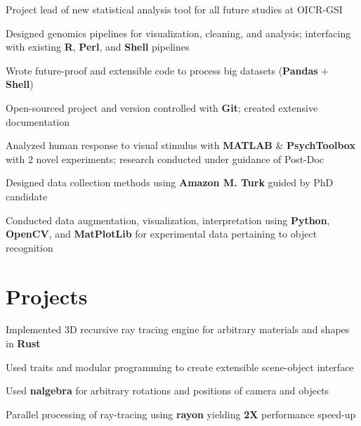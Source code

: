 \documentclass[]{chandan-cv}
\begin{document}
\begin{minipage}[t]{0.75\textwidth}
\begin{tightemize}
	\item Project lead of new statistical analysis tool for all future studies at OICR-GSI
	\item Designed genomics pipelines for visualization, cleaning, and analysis; 
	interfacing with existing \textbf{R}, \textbf{Perl}, and \textbf{Shell} pipelines
	\item Wrote future-proof and extensible code to process big datasets (\textbf{Pandas} + \textbf{Shell})
	\item Open-sourced project  and version controlled with \textbf{Git}; created extensive documentation
\end{tightemize}
\sectionsep

\begin{tightemize}
	\item Analyzed human response to visual stimulus with \textbf{MATLAB} \& \textbf{PsychToolbox} with 2 novel experiments; 
	research conducted under guidance of Post-Doc
	\item Designed data collection methods using \textbf{Amazon M. Turk} guided by PhD candidate
	\item Conducted data augmentation, visualization, interpretation using \textbf{Python}, 
	\textbf{OpenCV}, and \textbf{MatPlotLib} for experimental data pertaining to object recognition
\end{tightemize}
\sectionsep


\section{Projects}

\descript{ }
\location{ }
\begin{tightemize}
	\item Implemented 3D recursive ray tracing engine for arbitrary materials and shapes in \textbf{Rust}
	\item Used traits and modular programming to create extensible scene-object interface
	\item Used \textbf{nalgebra} for arbitrary rotations and positions of camera and objects 
	\item Parallel processing of ray-tracing using \textbf{rayon} yielding \textbf{2X} performance speed-up
\end{tightemize}
\sectionsep


\end{minipage}
\end{document}
